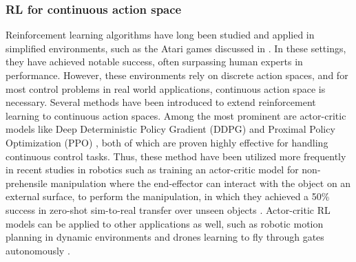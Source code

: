 \subsubsection{\textbf{RL for continuous action space}} Reinforcement learning algorithms have long been studied and applied in simplified environments, such as the Atari games discussed in \cite{c10}. In these settings, they have achieved notable success, often surpassing human experts in performance. However, these environments rely on discrete action spaces, and for most control problems in real world applications, continuous action space is necessary. Several methods have been introduced to extend reinforcement learning to continuous action spaces. Among the most prominent are actor-critic models like Deep Deterministic Policy Gradient (DDPG) \cite{c11} and Proximal Policy Optimization (PPO) \cite{c12}, both of which are proven highly effective for handling continuous control tasks. Thus, these method have been utilized more frequently in recent studies in robotics such as training an actor-critic model for non-prehensile manipulation where the end-effector can interact with the object on an external surface, to perform the manipulation, in which they achieved a 50\% success in zero-shot sim-to-real transfer over unseen objects \cite{c7}.
Actor-critic RL models can be applied to other applications as well, such as robotic motion planning in dynamic environments \cite{c14} and drones learning to fly through gates autonomously \cite{c13}.